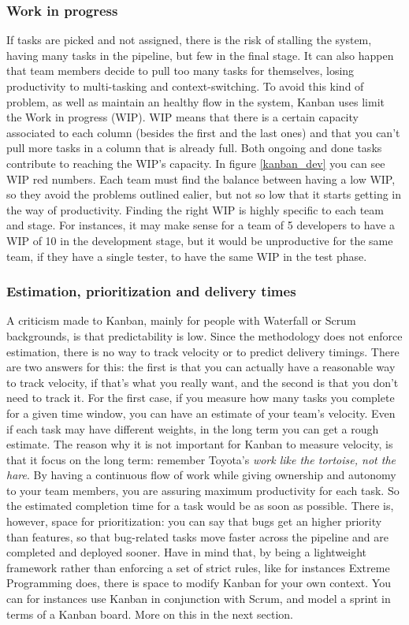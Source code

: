 \documentclass[conference]{IEEEtran}
\begin{document}
\subsubsection{Work in progress}
If tasks are picked and not assigned, there is the risk of stalling the system,
having many tasks in the pipeline, but few in the final stage. It can also happen
that team members decide to pull too many tasks for themselves, losing productivity
to multi-tasking and context-switching.
To avoid this kind of problem, as well as maintain an healthy flow in the system,
Kanban uses limit the Work in progress (WIP). WIP means that there is a certain
capacity associated to each column (besides the first and the last ones) and that
you can't pull more tasks in a column that is already full. Both ongoing and
done tasks contribute to reaching the WIP's capacity. In figure \ref{kanban_dev} you can see WIP red numbers.
Each team must find the balance between having a low WIP, so they avoid the problems
outlined ealier, but not so low that it starts getting in the way of productivity.
Finding the right WIP is highly specific to each team and stage. For instances,
it may make sense for a team of 5 developers to have a WIP of 10 in the development
stage, but it would be unproductive for the same team, if they have a single tester,
to have the same WIP in the test phase.

\subsubsection{Estimation, prioritization and delivery times}
A criticism made to Kanban, mainly for people with Waterfall or Scrum backgrounds,
is that predictability is low. Since the methodology does not enforce estimation,
there is no way to track velocity or to predict delivery timings.
There are two answers for this: the first is that you can actually have a reasonable
way to track velocity, if that's what you really want, and the second is that
you don't need to track it.
For the first case, if you measure how many tasks you complete for a given time window,
you can have an estimate of your team's velocity. Even if each task may have different
weights, in the long term you can get a rough estimate.
The reason why it is not important for Kanban to measure velocity, is that it focus
on the long term: remember Toyota's \textit{work like the tortoise, not the hare}.
By having a continuous flow of work while giving ownership and autonomy to your team
members, you are assuring maximum productivity for each task. So the estimated
completion time for a task would be as soon as possible. There is, however, space
for prioritization: you can say that bugs get an higher priority
than features, so that bug-related tasks move faster across the pipeline and are
completed and deployed sooner.
Have in mind that, by being a lightweight framework rather than enforcing a
set of strict rules, like for instances Extreme Programming does, there is
space to modify Kanban for your own context. You can for instances use Kanban
in conjunction with Scrum, and model a sprint in terms of a Kanban board.
More on this in the next section.
\end{document}
